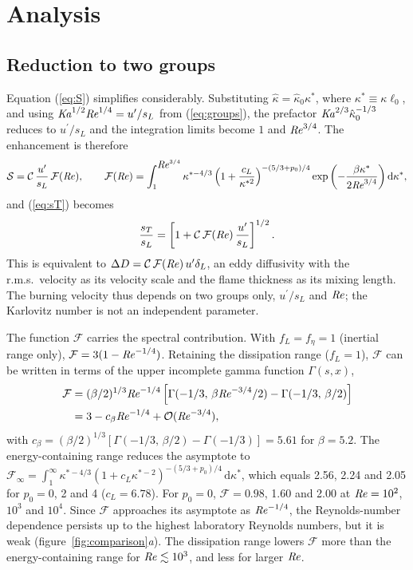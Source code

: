 \documentclass[lineno]{jfm}
\providecommand{\Rey}{\mbox{\textit{Re}}}
\providecommand{\Ka}{\mbox{\textit{Ka}}}
\newcommand{\sL}{s_L}
\newcommand{\dL}{\delta_L}
\newcommand{\Cs}{\mathcal{C}}
\newcommand{\kh}{\hat{\kappa}}
\newcommand{\up}{u^{\prime}}
\begin{document}
\section{Analysis}\label{sec:analysis}

\subsection{Reduction to two groups}\label{sec:reduction}

Equation (\ref{eq:S}) simplifies considerably. Substituting $\kh = \kh_0 \kappa^*$, where $\kappa^* \equiv \kappa \ell_0$, and using $\Ka^{1/2} \Rey^{1/4} = \up / \sL$ from (\ref{eq:groups}), the prefactor $\Ka^{2/3} \kh_0^{-1/3}$ reduces to $\up / \sL$ and the integration limits become $1$ and $\Rey^{3/4}$. The enhancement is therefore
\begin{equation}
  \mathcal{S} = \Cs \, \frac{\up}{\sL} \, \mathcal{F}(\Rey), \qquad
  \mathcal{F}(\Rey) = \int_1^{\Rey^{3/4}} \kappa^{*-4/3} \left(1 + \frac{c_L}{\kappa^{*2}}\right)^{-(5/3+p_0)/4}
  \exp \left(-\frac{\beta \kappa^*}{2 \Rey^{3/4}}\right) \mathrm{d} \kappa^*,
  \label{eq:SI}
\end{equation}
and (\ref{eq:sT}) becomes
\begin{equation}
  \frac{s_T}{\sL} = \left[1 + \Cs \, \mathcal{F}(\Rey) \, \frac{\up}{\sL}\right]^{1/2}.
  \label{eq:main}
\end{equation}
This is equivalent to $\Delta D = \Cs \, \mathcal{F}(\Rey) \, \up \dL$, an eddy diffusivity with the r.m.s.\ velocity as its velocity scale and the flame thickness as its mixing length. The burning velocity thus depends on two groups only, $\up / \sL$ and $\Rey$; the Karlovitz number is not an independent parameter.

The function $\mathcal{F}$ carries the spectral contribution. With $f_L = f_\eta = 1$ (inertial range only), $\mathcal{F} = 3(1 - \Rey^{-1/4})$. Retaining the dissipation range ($f_L = 1$), $\mathcal{F}$ can be written in terms of the upper incomplete gamma function $\Gamma(s, x)$,
\begin{align}
  \mathcal{F} &= (\beta / 2)^{1/3} \Rey^{-1/4} \left[\Gamma(-1/3, \, \beta \Rey^{-3/4} / 2) - \Gamma(-1/3, \, \beta / 2)\right] \nonumber \\
  &= 3 - c_\beta \Rey^{-1/4} + \mathcal{O}(\Rey^{-3/4}),
  \label{eq:Igamma}
\end{align}
with $c_\beta = (\beta / 2)^{1/3}[\Gamma(-1/3, \, \beta / 2) - \Gamma(-1/3)] = 5.61$ for $\beta = 5.2$. The energy-containing range reduces the asymptote to $\mathcal{F}_\infty = \int_1^\infty \kappa^{*-4/3}(1 + c_L \kappa^{*-2})^{-(5/3+p_0)/4} \, \mathrm{d} \kappa^*$, which equals 2.56, 2.24 and 2.05 for $p_0 = 0$, 2 and 4 ($c_L = 6.78$). For $p_0 = 0$, $\mathcal{F} = 0.98$, 1.60 and 2.00 at $\Rey = 10^2$, $10^3$ and $10^4$. Since $\mathcal{F}$ approaches its asymptote as $\Rey^{-1/4}$, the Reynolds-number dependence persists up to the highest laboratory Reynolds numbers, but it is weak (figure~\ref{fig:comparison}\textit{a}). The dissipation range lowers $\mathcal{F}$ more than the energy-containing range for $\Rey \lesssim 10^3$, and less for larger $\Rey$.
\end{document}
